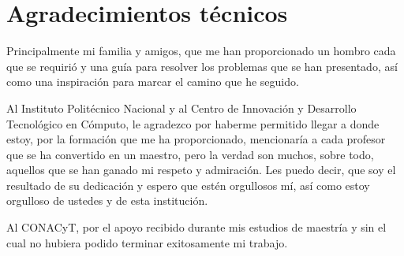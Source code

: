 \chapter{Agradecimientos t\'ecnicos}

Principalmente mi familia y amigos, que me han proporcionado un hombro cada que se requiri\'o y una gu\'ia para resolver los problemas que se han presentado, as\'i como una inspiraci\'on para marcar el camino que he seguido. 


Al Instituto Polit\'ecnico Nacional y al Centro de Innovaci\'on y Desarrollo Tecnol\'ogico en C\'omputo, le agradezco por haberme permitido llegar a donde estoy, por la formaci\'on que me ha proporcionado, mencionar\'ia a cada profesor que se ha convertido en un maestro, pero la verdad son muchos, sobre todo, aquellos que se han ganado mi respeto y admiraci\'on. Les puedo decir, que soy el resultado de su dedicaci\'on y espero que est\'en orgullosos m\'i, as\'i como estoy orgulloso de ustedes y de esta instituci\'on.


Al CONACyT, por el apoyo recibido durante mis estudios de maestr\'ia y sin el cual no hubiera podido terminar exitosamente mi trabajo.

